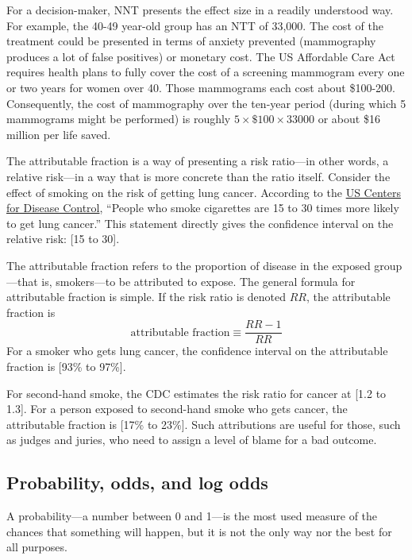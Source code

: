 \documentclass[
  letterpaper,
  DIV=11,
  numbers=noendperiod,
  oneside]{scrartcl}
\begin{document}
\begin{tcolorbox}
For a decision-maker, NNT presents the effect size in a readily
understood way. For example, the 40-49 year-old group has an NTT of
33,000. The cost of the treatment could be presented in terms of anxiety
prevented (mammography produces a lot of false positives) or monetary
cost. The US Affordable Care Act requires health plans to fully cover
the cost of a screening mammogram every one or two years for women over
40. Those mammograms each cost about \$100-200. Consequently, the cost
of mammography over the ten-year period (during which 5 mammograms might
be performed) is roughly \(5\times \$100 \times 33000\) or about \$16
million per life saved.

The attributable fraction is a way of presenting a risk ratio---in other
words, a relative risk---in a way that is more concrete than the ratio
itself. Consider the effect of smoking on the risk of getting lung
cancer. According to the
\href{https://www.cdc.gov/cancer/lung/basic_info/risk_factors.htm\#:~:text=People\%20who\%20smoke\%20cigarettes\%20are,the\%20risk\%20of\%20lung\%20cancer.}{US
Centers for Disease Control}, ``People who smoke cigarettes are 15 to 30
times more likely to get lung cancer.'' This statement directly gives
the confidence interval on the relative risk: {[}15 to 30{]}.

The attributable fraction refers to the proportion of disease in the
exposed group---that is, smokers---to be attributed to expose. The
general formula for attributable fraction is simple. If the risk ratio
is denoted \(RR\), the attributable fraction is
\[\text{attributable fraction} \equiv \frac{RR-1}{RR}\] For a smoker who
gets lung cancer, the confidence interval on the attributable fraction
is {[}93\% to 97\%{]}.

For second-hand smoke, the CDC estimates the risk ratio for cancer at
{[}1.2 to 1.3{]}. For a person exposed to second-hand smoke who gets
cancer, the attributable fraction is {[}17\% to 23\%{]}. Such
attributions are useful for those, such as judges and juries, who need
to assign a level of blame for a bad outcome.

\end{tcolorbox}

\subsection{Probability, odds, and log odds}\label{sec-log-odds}

A probability---a number between 0 and 1---is the most used measure of
the chances that something will happen, but it is not the only way nor
the best for all purposes.
\end{document}

